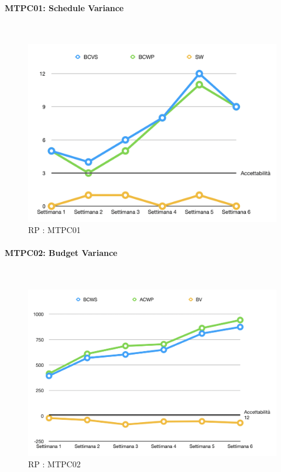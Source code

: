 \paragraph{MTPC01: Schedule Variance} ~\\
\begin{figure}[H]
	\begin{center}
		\includegraphics[scale=0.5]{./images/grafici_RP/MTPC01.png} 
	\end{center}
	\caption{RP : MTPC01}
\end{figure}

\paragraph{MTPC02: Budget Variance}\-\\
\begin{figure}[H]
	\begin{center}
		\includegraphics[scale=0.5]{./images/grafici_RP/MTPC02.png} 
	\end{center}
	\caption{RP : MTPC02}
\end{figure}


